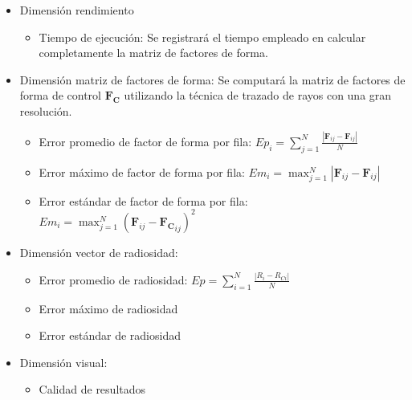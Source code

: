 \begin{itemize}
	\item Dimensión rendimiento
		\begin{itemize}
			\item Tiempo de ejecución: Se registrará el tiempo empleado en calcular completamente la matriz de factores de forma.
		\end{itemize}
	\item Dimensión matriz de factores de forma: Se computará la matriz de factores de forma de control $\mathbf{F_{C}}$ utilizando la técnica de trazado de rayos con una gran resolución.
		\begin{itemize}
			\item Error promedio de factor de forma por fila: $Ep_{i} = \sum_{j=1}^{N} \frac{|\mathbf{F}_{ij} -\mathbf{F}_{ij}|}{N}$
			\item Error máximo de factor de forma por fila: $Em_{i} = \max_{j=1}^{N}|\mathbf{F}_{ij} -\mathbf{F}_{ij}|$
			\item Error estándar de factor de forma por fila: $Em_{i} = \max_{j=1}^{N}(\mathbf{F}_{ij} -\mathbf{F_{C}}_{ij})^{2}$
		\end{itemize}
	\item Dimensión vector de radiosidad:
	\begin{itemize}
		\item Error promedio de radiosidad: $Ep = \sum_{i=1}^{N} \frac{|R_{i}-R_{Ci}|}{N}$
		\item Error máximo de radiosidad
		\item Error estándar de radiosidad
	\end{itemize}
\item Dimensión visual:
	\begin{itemize}
		\item Calidad de resultados
	\end{itemize}
\end{itemize}
